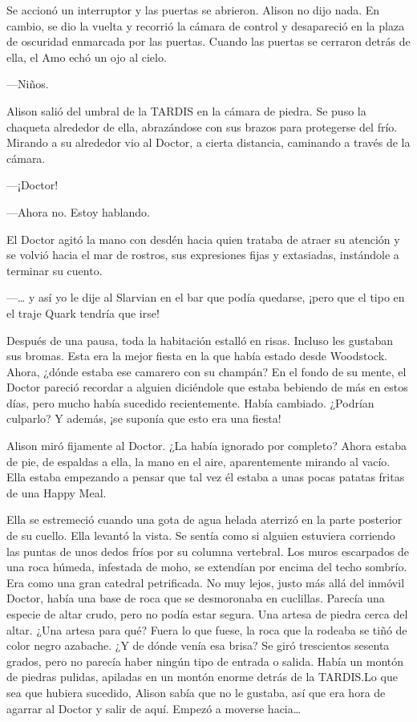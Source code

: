 {Se accionó un interruptor y las puertas se abrieron. Alison no dijo
 nada. En cambio, se dio la vuelta y recorrió la cámara de control y
 desapareció en la plaza de oscuridad enmarcada por las puertas. Cuando
las puertas se cerraron detrás de ella, el Amo echó un ojo al cielo.}

{---Niños.}

{Alison salió del umbral de la TARDIS en la cámara de piedra. Se puso la
 chaqueta alrededor de ella, abrazándose con sus brazos para protegerse
 del frío. Mirando a su alrededor vio al Doctor, a cierta distancia,
caminando a través de la cámara.}

{---¡Doctor!}

{---Ahora no. Estoy hablando.}

{El Doctor agitó la mano con desdén hacia quien trataba de atraer su
 atención y se volvió hacia el mar de rostros, sus expresiones fijas y
extasiadas, instándole a terminar su cuento.}

{---\ldots{} y así yo le dije al Slarvian en el bar que podía quedarse,
¡pero que el tipo en el traje Quark tendría que irse!}

{Después de una pausa, toda la habitación estalló en risas. Incluso les
 gustaban sus bromas. Esta era la mejor fiesta en la que había estado
 desde Woodstock. Ahora, ¿dónde estaba ese camarero con su champán? En el
 fondo de su mente, el Doctor pareció recordar a alguien diciéndole que
 estaba bebiendo de más en estos días, pero mucho había sucedido
 recientemente. Había cambiado. ¿Podrían culparlo? Y además, ¡se suponía
que esto era una fiesta!}

{Alison miró fijamente al
 Doctor. ¿La había ignorado por completo? Ahora estaba de pie, de
 espaldas a ella, la mano en el aire, aparentemente mirando al vacío.
 Ella estaba empezando a pensar que tal vez él estaba a unas pocas
patatas fritas de una Happy Meal.}

{Ella se estremeció cuando una gota de agua helada aterrizó en la parte
 posterior de su cuello. Ella levantó la vista. Se sentía como si alguien
 estuviera corriendo las puntas de unos dedos fríos por su columna
 vertebral. Los muros escarpados de una roca húmeda, infestada de moho,
 se extendían por encima del techo sombrío. Era como una gran catedral
 petrificada. No muy lejos, justo más allá del inmóvil Doctor, había una
 base de roca que se desmoronaba en cuclillas. Parecía una especie de
 altar crudo, pero no podía estar segura. Una artesa de piedra cerca del
 altar. ¿Una artesa para qué? Fuera lo que fuese, la roca que la rodeaba
 se tiñó de color negro azabache. ¿Y de dónde venía esa brisa? Se giró
 trescientos sesenta grados, pero no parecía haber ningún tipo de entrada
 o salida. Había un montón de piedras pulidas, apiladas en un montón
 enorme detrás de la TARDIS.\@ Lo que sea que hubiera sucedido, Alison
 sabía que no le gustaba, así que era hora de agarrar al Doctor y salir
 de aquí. Empezó a moverse hacia\ldots{}}

